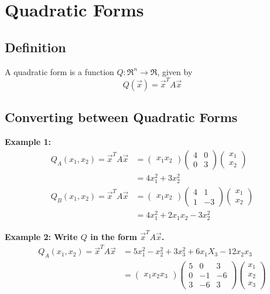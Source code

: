 \section{Quadratic Forms}
\subsection{Definition}
\begin{definition}
    A quadratic form is a function \(Q: \Re^n \rightarrow \Re\), given by
    \[Q(\Vec{x}) = \Vec{x}^T A \Vec{x}\]
\end{definition}

\subsection{Converting between Quadratic Forms}
\textbf{Example 1:}
\begin{align}
    Q_A(x_1, x_2) = \Vec{x}^T A \Vec{x} &= \begin{pmatrix}
        x_1 x_2
    \end{pmatrix} \begin{pmatrix}
        4 & 0 \\ 0 & 3
    \end{pmatrix} \begin{pmatrix}
        x_1 \\ x_2
    \end{pmatrix} \\ &= 4x_1^2 + 3x_2^2 \\
    Q_B(x_1, x_2) = \Vec{x}^T A \Vec{x} &= \begin{pmatrix}
        x_1 x_2
    \end{pmatrix} \begin{pmatrix}
        4 & 1 \\ 1 & -3
    \end{pmatrix} \begin{pmatrix}
        x_1 \\ x_2
    \end{pmatrix} \\ &= 4x_1^2 + 2x_1 x_2 - 3x_2^2
\end{align}

\noindent
\newline
\textbf{Example 2: Write \(Q\) in the form \(\Vec{x}^T A \Vec{x}\).}
\begin{align}
    Q_A(x_1, x_2) = \Vec{x}^T A \Vec{x} &= 5x_1^2 - x_2^2 + 3x_3^2 + 6x_1 X_3 - 12 x_2 x_3 \\
    &= \begin{pmatrix}
        x_1 x_2 x_3
    \end{pmatrix} \begin{pmatrix}
        5 & 0 & 3 \\
        0 & -1 & -6 \\
        3 & -6 & 3
    \end{pmatrix} \begin{pmatrix}
        x_1 \\ x_2 \\ x_3
    \end{pmatrix} \\
\end{align}

